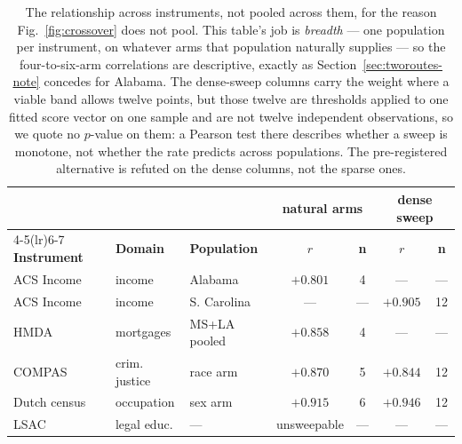 \documentclass[conference]{IEEEtran}
\begin{document}
\begin{table}[t]
\caption{The relationship across instruments, not pooled across them, for the reason
Fig.~\ref{fig:crossover} does not pool. This table's job is \emph{breadth} --- one population
per instrument, on whatever arms that population naturally supplies --- so the four-to-six-arm
correlations are descriptive, exactly as Section~\ref{sec:tworoutes-note} concedes for Alabama.
The dense-sweep columns carry the weight where a viable band allows twelve points, but
those twelve are thresholds applied to one fitted score vector on one sample and are not
twelve independent observations, so we quote no $p$-value on them: a Pearson test there
describes whether a sweep is monotone, not whether the rate predicts across populations. The
pre-registered alternative is refuted on the dense columns, not the sparse ones.}
\label{tab:domains}
\centering
\scriptsize
\setlength{\tabcolsep}{2.5pt}
\begin{tabular}{@{}lllcccc@{}}
\toprule
& & & \multicolumn{2}{c}{\textbf{natural arms}} & \multicolumn{2}{c}{\textbf{dense sweep}} \\
\cmidrule(lr){4-5}\cmidrule(lr){6-7}
\textbf{Instrument} & \textbf{Domain} & \textbf{Population} & \textbf{$r$} & \textbf{n} &
\textbf{$r$} & \textbf{n} \\
\midrule
ACS Income & income & Alabama & $+0.801$ & 4 & --- & --- \\
ACS Income & income & S. Carolina & --- & --- & $+0.905$ & 12 \\
HMDA & mortgages & MS+LA pooled & $+0.858$ & 4 & --- & --- \\
COMPAS & crim. justice & race arm & $+0.870$ & 5 & $+0.844$ & 12 \\
Dutch census & occupation & sex arm & $+0.915$ & 6 & $+0.946$ & 12 \\
LSAC & legal educ. & --- & unsweepable & --- & --- & --- \\
\bottomrule
\end{tabular}
\end{table}
\end{document}
